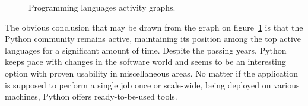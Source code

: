 \begin{figure}[ht]
  \begin{center}
  \end{center}
  \caption{Programming languages activity graphs.}
  \label{fig:ohloh_lang_graph}
\end{figure}
The obvious conclusion that may be drawn from the graph on figure~\ref{fig:ohloh_lang_graph} is that the Python community remains active, maintaining its position among the top active languages for a significant amount of time. Despite the passing years, Python keeps pace with changes in the software world and seems to be an interesting option with proven usability in miscellaneous areas. No matter if the application is supposed to perform a single job once or scale-wide, being deployed on various machines, Python offers ready-to-be-used tools.
 
